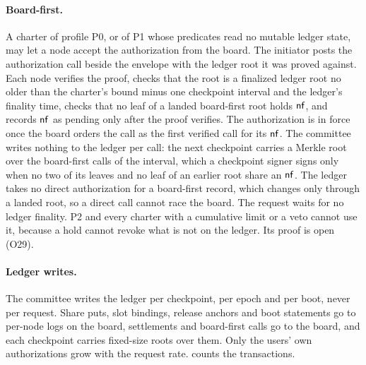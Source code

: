 \paragraph{Board-first.} A charter of profile P0, or of P1 whose predicates read no mutable ledger state, may let a node accept the authorization from the board. The initiator posts the authorization call beside the envelope with the ledger root it was proved against. Each node verifies the proof, checks that the root is a finalized ledger root no older than the charter's bound minus one checkpoint interval and the ledger's finality time, checks that no leaf of a landed board-first root holds $\mathsf{nf}$, and records $\mathsf{nf}$ as pending only after the proof verifies. The authorization is in force once the board orders the call as the first verified call for its $\mathsf{nf}$. The committee writes nothing to the ledger per call: the next checkpoint carries a Merkle root over the board-first calls of the interval, which a checkpoint signer signs only when no two of its leaves and no leaf of an earlier root share an $\mathsf{nf}$. The ledger takes no direct authorization for a board-first record, which changes only through a landed root, so a direct call cannot race the board. The request waits for no ledger finality. P2 and every charter with a cumulative limit or a veto cannot use it, because a hold cannot revoke what is not on the ledger. Its proof is open (O29).

\paragraph{Ledger writes.} The committee writes the ledger per checkpoint, per epoch and per boot, never per request. Share puts, slot bindings, release anchors and boot statements go to per-node logs on the board, settlements and board-first calls go to the board, and each checkpoint carries fixed-size roots over them. Only the users' own authorizations grow with the request rate.  counts the transactions.

